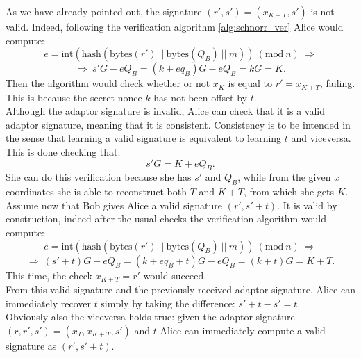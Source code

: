 \bigskip
\noindent
As we have already pointed out, the signature $(r', s') = (x_{K + T}, s')$ is not valid. Indeed, following the verification algorithm \ref{alg:schnorr_ver} Alice would compute:
$$e = \text{int}(\text{hash}(\text{bytes}(r') \ || \ \text{bytes}(Q_B) \ || \ m)) \ (\text{mod} \ n) \ \Longrightarrow$$
$$\Longrightarrow \ s'G - eQ_B = (k + eq_B)G - eQ_B = kG = K.$$
Then the algorithm would check whether or not $x_K$ is equal to $r' = x_{K + T}$, failing. This is because the secret nonce $k$ has not been offset by $t$.
\\
Although the adaptor signature is invalid, Alice can check that it is a valid adaptor signature, meaning that it is consistent. Consistency is to be intended in the sense that learning a valid signature is equivalent to learning $t$ and viceversa. This is done checking that:
$$s'G = K + eQ_B.$$
She can do this verification because she has $s'$ and $Q_B$, while from the given $x$ coordinates she is able to reconstruct both $T$ and $K + T$, from which she gets $K$.
\\
Assume now that Bob gives Alice a valid signature $(r', s' + t)$. It is valid by construction, indeed after the usual checks the verification algorithm would compute:
$$e = \text{int}(\text{hash}(\text{bytes}(r') \ || \ \text{bytes}(Q_B) \ || \ m)) \ (\text{mod} \ n) \ \Longrightarrow$$
$$\Longrightarrow \ (s' + t)G - eQ_B = (k + eq_B + t)G - eQ_B = (k + t)G = K + T.$$
This time, the check $x_{K + T} = r'$ would succeed. 
\\
From this valid signature and the previously received adaptor signature, Alice can immediately recover $t$ simply by taking the difference: $s' + t - s' = t$.
\\
Obviously also the viceversa holds true: given the adaptor signature $(r, r', s') = (x_T, x_{K + T}, s')$ and $t$ Alice can immediately compute a valid signature as $(r', s' + t)$.

